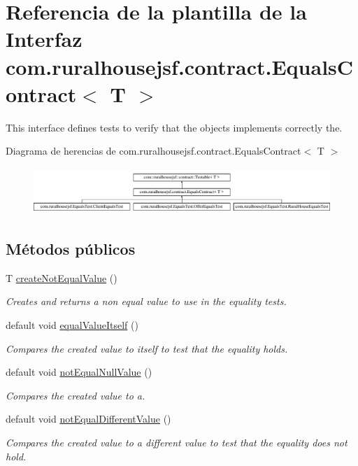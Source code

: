 \hypertarget{a00240}{}\section{Referencia de la plantilla de la Interfaz com.\+ruralhousejsf.\+contract.\+Equals\+Contract$<$ T $>$}
\label{a00240}


This interface defines tests to verify that the objects implements correctly the.  


Diagrama de herencias de com.\+ruralhousejsf.\+contract.\+Equals\+Contract$<$ T $>$\begin{figure}[H]
\begin{center}
\leavevmode
\includegraphics[height=1.777778cm]{a00240}
\end{center}
\end{figure}
\subsection*{Métodos públicos}
\begin{DoxyCompactItemize}
\item 
T \mbox{\hyperlink{a00240_a65840509b57f6b89e42e2abf1978aa01}{create\+Not\+Equal\+Value}} ()
\begin{DoxyCompactList}\small\item\em Creates and returns a non equal value to use in the equality tests. \end{DoxyCompactList}\item 
default void \mbox{\hyperlink{a00240_a5daf9e73e1147c8765c0fcf3d3dddbb0}{equal\+Value\+Itself}} ()
\begin{DoxyCompactList}\small\item\em Compares the created value to itself to test that the equality holds. \end{DoxyCompactList}\item 
default void \mbox{\hyperlink{a00240_adda6a50dc1babeb3783fd92a09aac788}{not\+Equal\+Null\+Value}} ()
\begin{DoxyCompactList}\small\item\em Compares the created value to a. \end{DoxyCompactList}\item 
default void \mbox{\hyperlink{a00240_acaa5c1c071bf63a3e629977c73131fc8}{not\+Equal\+Different\+Value}} ()
\begin{DoxyCompactList}\small\item\em Compares the created value to a different value to test that the equality does not hold. \end{DoxyCompactList}\end{DoxyCompactItemize}


